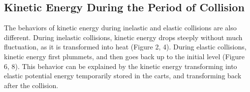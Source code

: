 \subsection{Kinetic Energy During the Period of Collision}
The behaviors of kinetic energy during inelastic and elastic collisions are also different. During inelastic collisions, kinetic energy drops steeply without much fluctuation, as it is transformed into heat (Figure 2, 4). During elastic collisions, kinetic energy first plummets, and then goes back up to the initial level (Figure 6, 8). This behavior can be explained by the kinetic energy transforming into elastic potential energy temporarily stored in the carts, and transforming back after the collision.


